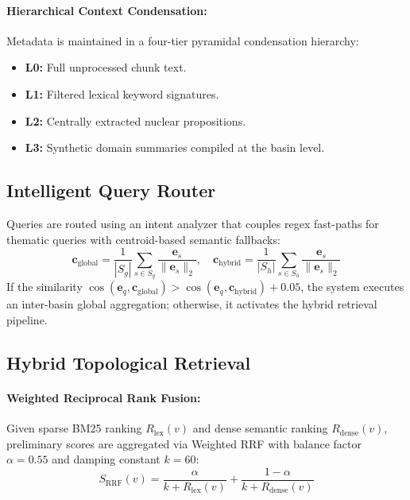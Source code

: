 \documentclass[10pt,twocolumn]{article}
\theoremstyle{definition}
\begin{document}
\paragraph{Hierarchical Context Condensation:}
Metadata is maintained in a four-tier pyramidal condensation hierarchy:
\begin{itemize}
    \item \textbf{L0:} Full unprocessed chunk text.
    \item \textbf{L1:} Filtered lexical keyword signatures.
    \item \textbf{L2:} Centrally extracted nuclear propositions.
    \item \textbf{L3:} Synthetic domain summaries compiled at the basin level.
\end{itemize}

\subsection{Intelligent Query Router}

Queries are routed using an intent analyzer that couples regex fast-paths for thematic queries with centroid-based semantic fallbacks:
\begin{equation}
\mathbf{c}_{\text{global}} = \frac{1}{|S_g|} \sum_{s \in S_g} \frac{\mathbf{e}_s}{\|\mathbf{e}_s\|_2}, \quad \mathbf{c}_{\text{hybrid}} = \frac{1}{|S_h|} \sum_{s \in S_h} \frac{\mathbf{e}_s}{\|\mathbf{e}_s\|_2}
\end{equation}
If the similarity $\cos(\mathbf{e}_q, \mathbf{c}_{\text{global}}) > \cos(\mathbf{e}_q, \mathbf{c}_{\text{hybrid}}) + 0.05$, the system executes an inter-basin global aggregation; otherwise, it activates the hybrid retrieval pipeline.

\subsection{Hybrid Topological Retrieval}

\paragraph{Weighted Reciprocal Rank Fusion:}
Given sparse BM25 ranking $R_{\text{lex}}(v)$ and dense semantic ranking $R_{\text{dense}}(v)$, preliminary scores are aggregated via Weighted RRF with balance factor $\alpha = 0.55$ and damping constant $k = 60$:
\begin{equation}
S_{\text{RRF}}(v) = \frac{\alpha}{k + R_{\text{lex}}(v)} + \frac{1 - \alpha}{k + R_{\text{dense}}(v)}
\end{equation}
\end{document}
